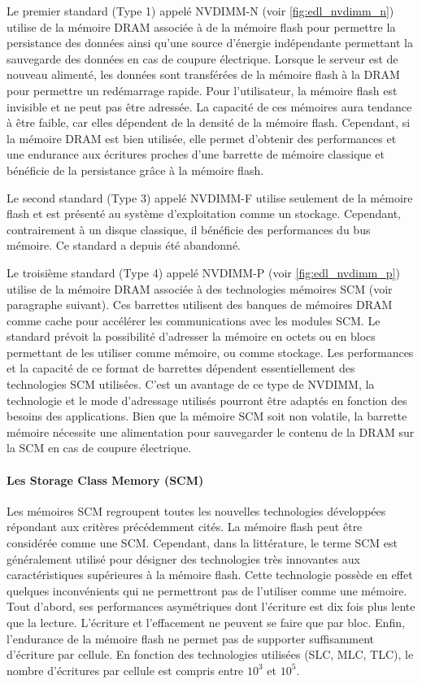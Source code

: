         Le premier standard (Type 1) appelé NVDIMM-N (voir \autoref{fig:edl_nvdimm_n}) utilise de la mémoire DRAM associée à de la mémoire flash pour permettre la persistance des données ainsi qu'une source d'énergie indépendante permettant la sauvegarde des données en cas de coupure électrique. Lorsque le serveur est de nouveau alimenté, les données sont transférées de la mémoire flash à la DRAM pour permettre un redémarrage rapide. Pour l'utilisateur, la mémoire flash est invisible et ne peut pas être adressée. La capacité de ces mémoires aura tendance à être faible, car elles dépendent de la densité de la mémoire flash. Cependant, si la mémoire DRAM est bien utilisée, elle permet d'obtenir des performances et une endurance aux écritures proches d'une barrette de mémoire classique et bénéficie de la persistance grâce à la mémoire flash. 
            
        Le second standard (Type 3) appelé NVDIMM-F utilise seulement de la mémoire flash et est présenté au système d'exploitation comme un stockage. Cependant, contrairement à un disque classique, il bénéficie des performances du bus mémoire. Ce standard a depuis été abandonné. 
        
        Le troisième standard (Type 4) appelé NVDIMM-P (voir \autoref{fig:edl_nvdimm_p}) utilise de la mémoire DRAM associée à des technologies mémoires SCM (voir paragraphe suivant). Ces barrettes utilisent des banques de mémoires DRAM comme cache pour accélérer les communications avec les modules SCM. Le standard prévoit la possibilité d'adresser la mémoire en octets ou en blocs permettant de les utiliser comme mémoire, ou comme stockage. Les performances et la capacité de ce format de barrettes dépendent essentiellement des technologies SCM utilisées. C'est un avantage de ce type de NVDIMM, la technologie et le mode d'adressage utilisés pourront être adaptés en fonction des besoins des applications. Bien que la mémoire SCM soit non volatile, la barrette mémoire nécessite une alimentation pour sauvegarder le contenu de la DRAM sur la SCM en cas de coupure électrique.

    \paragraph{Les Storage Class Memory (SCM)}\label{sec:SCM}
    
        Les mémoires SCM regroupent toutes les nouvelles technologies développées répondant aux critères précédemment cités. La mémoire flash peut être considérée comme une SCM. Cependant, dans la littérature, le terme SCM est généralement utilisé pour désigner des technologies très innovantes aux caractéristiques supérieures à la mémoire flash. Cette technologie possède en effet quelques inconvénients qui ne permettront pas de l'utiliser comme une mémoire. Tout d'abord, ses performances asymétriques dont l'écriture est dix fois plus lente que la lecture. L'écriture et l'effacement ne peuvent se faire que par bloc. Enfin, l'endurance de la mémoire flash ne permet pas de supporter suffisamment d'écriture par cellule. En fonction des technologies utilisées (SLC, MLC, TLC), le nombre d'écritures par cellule est compris entre $10^3$ et $10^5$.  
        
